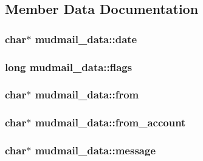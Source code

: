 \subsection{Member Data Documentation}
\hypertarget{structmudmail__data_afe51d78012144e891770924377d69cb0}{
\subsubsection[{date}]{\setlength{\rightskip}{0pt plus 5cm}char$\ast$ mudmail\-\_\-data\-::date}}\label{structmudmail__data_afe51d78012144e891770924377d69cb0}
\hypertarget{structmudmail__data_a147f443bec36861233b0a60b6e0f7af5}{
\subsubsection[{flags}]{\setlength{\rightskip}{0pt plus 5cm}long mudmail\-\_\-data\-::flags}}\label{structmudmail__data_a147f443bec36861233b0a60b6e0f7af5}
\hypertarget{structmudmail__data_a848d4702ba770327fa5aff376bc92198}{
\subsubsection[{from}]{\setlength{\rightskip}{0pt plus 5cm}char$\ast$ mudmail\-\_\-data\-::from}}\label{structmudmail__data_a848d4702ba770327fa5aff376bc92198}
\hypertarget{structmudmail__data_a1ed7bbe5b5ef960746276eec8dcb6fd2}{
\subsubsection[{from\-\_\-account}]{\setlength{\rightskip}{0pt plus 5cm}char$\ast$ mudmail\-\_\-data\-::from\-\_\-account}}\label{structmudmail__data_a1ed7bbe5b5ef960746276eec8dcb6fd2}
\hypertarget{structmudmail__data_a2c7609bbdbdbc97bc887169c3d1695b0}{
\subsubsection[{message}]{\setlength{\rightskip}{0pt plus 5cm}char$\ast$ mudmail\-\_\-data\-::message}}\label{structmudmail__data_a2c7609bbdbdbc97bc887169c3d1695b0}
